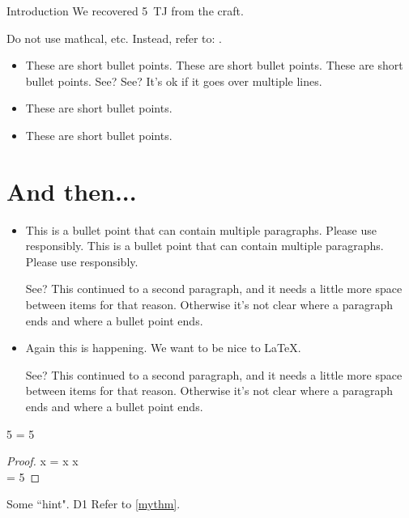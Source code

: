 \begin{MainChapter}{Introduction}
We recovered \qty{5}{\tera\joule} from the craft.

Do not use mathcal, etc. Instead, refer to: .

\begin{itemize}
    \item These are short bullet points. These are short bullet points. These are short bullet points. See? See? It's ok if it goes over multiple lines.
    \item These are short bullet points.
    \item These are short bullet points.
\end{itemize}

\newpage
\section{And then...}

\begin{itemize}[long]
    \item
    This is a bullet point that can contain multiple paragraphs. Please use responsibly.
    This is a bullet point that can contain multiple paragraphs. Please use responsibly.
    
    See? This continued to a second paragraph, and it needs a little more space between items for that reason. Otherwise it's not clear where a paragraph ends and where a bullet point ends.
    
    \item Again this is happening. We want to be nice to LaTeX.
    
    See? This continued to a second paragraph, and it needs a little more space between items for that reason. Otherwise it's not clear where a paragraph ends and where a bullet point ends.
\end{itemize}

\begin{Theorem}[label=mythm, name=Fiveness]
5 = 5
\end{Theorem}

\begin{proof}
x = x \forall x\\
 = 5
\end{proof}

\begin{Hint}[name = An optional title., label=fives]
Some ``hint". \ac{D1}
Refer to \cref{mythm}.
\end{Hint}


\end{MainChapter}
